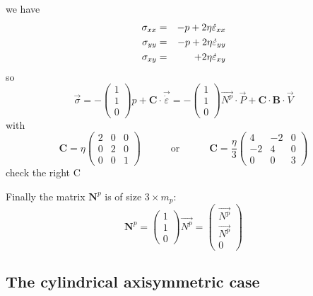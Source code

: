 we have 
\begin{eqnarray}
\sigma_{xx}&=&-p + 2\eta \dot\varepsilon_{xx} \\
\sigma_{yy}&=&-p + 2\eta \dot\varepsilon_{yy} \\
\sigma_{xy}&=& \hspace{5.5mm} + 2\eta \dot\varepsilon_{xy} 
\end{eqnarray}
so
\begin{equation}
\vec{\sigma} 
=-\left( 
\begin{array}{c}
1 \\ 1 \\ 0 
\end{array}
\right) p+ {\bm C} \cdot \vec{\dot\varepsilon}
=
- \left(
\begin{array}{c}
1 \\ 1 \\ 0 
\end{array}
\right)
\vec{N^p} \cdot {\vec P}  + 
{\bm C} \cdot  {\bm B}\cdot {\vec V}
\end{equation}
with
\begin{equation}
{\bm C}=
\eta
\left(
\begin{array}{ccc}
2 & 0 & 0 \\
0 & 2 & 0 \\
0 & 0 & 1  
\end{array}
\right)
\quad\quad\quad
\text{or}
\quad\quad\quad
{\bm C}=
\frac{\eta}{3}
\left(
\begin{array}{ccc}
4 & -2 & 0 \\
-2 & 4 & 0 \\
0 & 0 & 3  
\end{array}
\right)
\end{equation}
{\color{red} check the right C}

Finally the matrix ${\bm N}^p$ is of size $3\times m_p$:
\begin{equation}
{\bm N}^p=
\left(
\begin{array}{c}
1 \\ 1 \\ 0
\end{array}
\right)
\vec{N^p} 
=
\left(
\begin{array}{c}
\vec{N^p} \\
\vec{N^p} \\
0
\end{array}
\right)
\end{equation}



\newpage
\subsection{The cylindrical axisymmetric case} \label{ss:cyl_axi}


